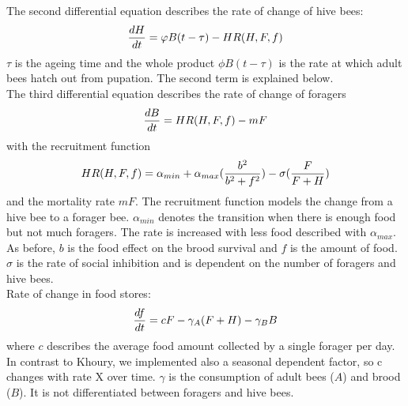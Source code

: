 The second differential equation describes the rate of change of hive bees:
\begin{equation}
{dH \over dt}=\phi B(t-\tau)-HR(H,F,f)
\end{equation}
$\tau$ is the ageing time and the whole product $\phi B(t-\tau)$ is the rate at which adult bees hatch out from pupation. The second term is explained below.\\ 
The third differential equation describes the rate of change of foragers  
\begin{equation}\label{Rate of change of foragers}
{dB \over dt} = HR(H,F,f)-m F
\end{equation}
with the recruitment function 
\begin{equation}\label{rate of change of foragers }
HR(H,F,f) = \alpha_{min} + \alpha_{max}({b^2 \over b^2+f^2})-\sigma({F \over F+H})
\end{equation}
and the mortality rate $mF$. The recruitment function models the change from a hive bee to a forager bee. $\alpha_{min}$ denotes the transition when there is enough food but not much foragers. The rate is increased with less food described with $\alpha_{max}$. As before, $b$ is the food effect on the brood survival and $f$ is the amount of food. $\sigma$ is the rate of social inhibition and is dependent on the number of foragers and hive bees.\\
Rate of change in food stores:
\begin{equation}\label{Rate of change in food stores}
{df \over dt} = c F - \gamma_A (F+H) - \gamma_B B
\end{equation}
where $c$ describes the average food amount collected by a single forager per day. In contrast to Khoury, we implemented also a seasonal dependent factor, so c changes with rate X over time. $\gamma$ is the consumption of adult bees ($A$) and brood ($B$). It is not differentiated between foragers and hive bees.  



